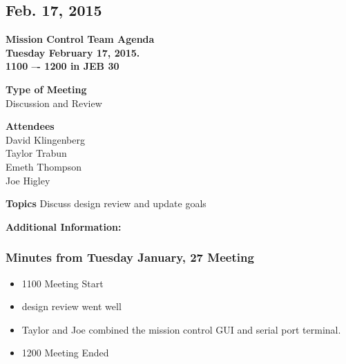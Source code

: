 \documentclass[pdftex,11pt]{article}
\begin{document}
\clearpage


\subsection{Feb. 17, 2015}
{ \huge \bfseries Mission Control Team Agenda \\[0.4cm] }
{ \huge \bfseries Tuesday February 17, 2015.\\1100 –-  1200  in JEB 30\\[0.4cm] }
\vspace*{2.5mm}

{ \large \bfseries \hspace*{2 mm} Type of Meeting\\}
\hspace*{12 mm}  Discussion and Review
\vspace*{1.5mm}

{ \large \bfseries \hspace*{2 mm} Attendees\\}
\hspace*{12mm} David Klingenberg\\
\hspace*{12mm} Taylor Trabun\\
\hspace*{12mm} Emeth Thompson\\
\hspace*{12mm} Joe Higley\\
\vspace*{1.5mm}

{ \large \bfseries \noindent Topics}
\hspace*{12mm} Discuss design review and update goals
\vspace*{2.5mm}

\vspace*{2.5mm}
{ \large \bfseries \noindent Additional Information:}

\subsubsection[short]{Minutes from Tuesday January, 27 Meeting}
\begin{itemize}
	\item 1100 \indent Meeting Start
	\item design review went well
	\item Taylor and Joe combined the mission control GUI and serial port terminal.
	\item 1200 \indent Meeting Ended
\end{itemize}	
\end{document}
